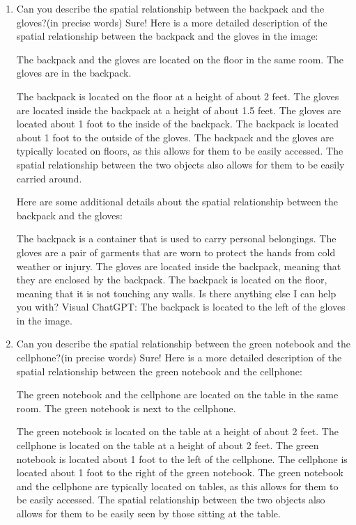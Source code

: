 \begin{enumerate}
    \item Can you describe the spatial relationship between the backpack and the gloves?(in precise words)
    \subitem Sure! Here is a more detailed description of the spatial relationship between the backpack and the gloves in the image:

    The backpack and the gloves are located on the floor in the same room. The gloves are in the backpack.
    
    The backpack is located on the floor at a height of about 2 feet.
    The gloves are located inside the backpack at a height of about 1.5 feet.
    The gloves are located about 1 foot to the inside of the backpack.
    The backpack is located about 1 foot to the outside of the gloves.
    The backpack and the gloves are typically located on floors, as this allows for them to be easily accessed. The spatial relationship between the two objects also allows for them to be easily carried around.
    
    Here are some additional details about the spatial relationship between the backpack and the gloves:
    
    The backpack is a container that is used to carry personal belongings.
    The gloves are a pair of garments that are worn to protect the hands from cold weather or injury.
    The gloves are located inside the backpack, meaning that they are enclosed by the backpack.
    The backpack is located on the floor, meaning that it is not touching any walls.
    Is there anything else I can help you with?
    \subitem Visual ChatGPT: The backpack is located to the left of the gloves in the image.
    \item Can you describe the spatial relationship between the green notebook and the cellphone?(in precise words)
    \subitem 
    Sure! Here is a more detailed description of the spatial relationship between the green notebook and the cellphone:
    
    The green notebook and the cellphone are located on the table in the same room. The green notebook is next to the cellphone.
    
    The green notebook is located on the table at a height of about 2 feet.
    The cellphone is located on the table at a height of about 2 feet.
    The green notebook is located about 1 foot to the left of the cellphone.
    The cellphone is located about 1 foot to the right of the green notebook.
    The green notebook and the cellphone are typically located on tables, as this allows for them to be easily accessed. The spatial relationship between the two objects also allows for them to be easily seen by those sitting at the table.
    

\end{enumerate}
